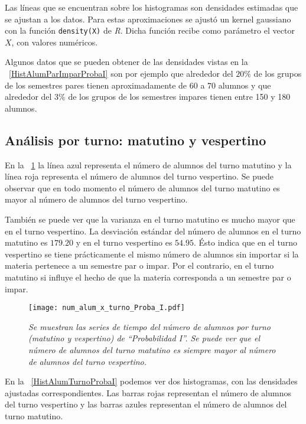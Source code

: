 Las líneas que se encuentran sobre los histogramas son densidades estimadas que se ajustan a los datos. Para estas aproximaciones se ajustó un kernel gaussiano con la función \verb+density(X)+ de \textit{R}. Dicha función recibe como parámetro el vector $X$, con valores numéricos.

Algunos datos que se pueden obtener de las densidades vistas en la \figurename{~\ref{HistAlumParImparProbaI}} son por ejemplo que alrededor del $20\%$ de los grupos de los semestres pares tienen aproximadamente de $60$ a $70$ alumnos y que alrededor del $3\%$ de los grupos de los semestres impares tienen entre 150 y 180 alumnos. %

\subsection{Análisis por turno: matutino y vespertino}

En la \figurename{~\ref{num_alum_x_turno_Proba_I}} la línea azul representa el número de alumnos del turno matutino y la línea roja representa el número de alumnos del turno vespertino. Se puede observar que en todo momento el número de alumnos del turno matutino es mayor al número de alumnos del turno vespertino.

También se puede ver que la varianza en el turno matutino es mucho mayor que en el turno vespertino. La desviación estándar del número de alumnos en el turno matutino es $179.20$ y en el turno vespertino es $54.95$. Ésto indica que en el turno vespertino se tiene prácticamente el mismo número de alumnos sin importar si la materia pertenece a un semestre par o impar. Por el contrario, en el turno matutino si influye el hecho de que la materia corresponda a un semestre par o impar.


\begin{figure}[h]
\centering
\texttt{[image: num\_alum\_x\_turno\_Proba\_I.pdf]} %
\caption[\textit{Número de alumnos por turno: Probabilidad I}]{\textit{Se muestran las series de tiempo del número de alumnos por turno (matutino y vespertino) de ``Probabilidad I''. Se puede ver que el número de alumnos del turno matutino es siempre mayor al número de alumnos del turno vespertino.}}\label{num_alum_x_turno_Proba_I}
\end{figure}

En la \figurename{~\ref{HistAlumTurnoProbaI}} podemos ver dos histogramas, con las densidades ajustadas correspondientes. Las barras rojas representan el número de alumnos del turno vespertino y las barras azules representan el número de alumnos del turno matutino.

